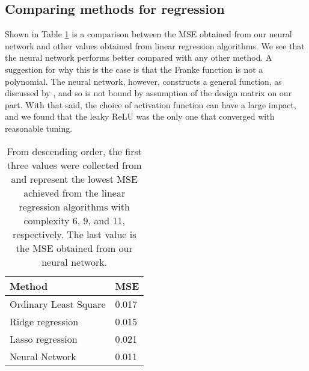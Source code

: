 \subsection{Comparing methods for regression}
Shown in Table \ref{tab:mse} is a comparison between the MSE obtained from our neural network and other values obtained from linear regression algorithms. We see that the neural network performs better compared with any other method. A suggestion for why this is the case is that the Franke function is not a polynomial. The neural network, however, constructs a general function, as discussed by \citet{Nielsen}, and so is not bound by assumption of the design matrix on our part. With that said, the choice of activation function can have a large impact, and we found that the leaky ReLU was the only one that converged with reasonable tuning.
\begin{table}[htbp]
	\renewcommand{\arraystretch}{1.2}
	\centering
	\caption{From descending order, the first three values were collected from \citet{prosjekt1} and represent the lowest MSE achieved from the linear regression algorithms with complexity 6, 9, and 11, respectively. The last value is the MSE obtained from our neural network.}
	\begin{tabular}{l l}
		\toprule
		Method & MSE \\
		\midrule
		Ordinary Least Square & 0.017 \\
		Ridge regression & 0.015\\
		Lasso regression & 0.021\\
		Neural Network & 0.011\\
		\bottomrule
	\end{tabular}
	\label{tab:mse}
\end{table}
